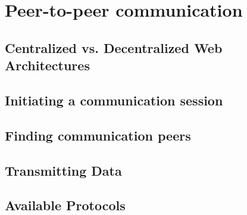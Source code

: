 
\section{Peer-to-peer communication}
\label{sec:p2p_communication}

\subsection{Centralized vs. Decentralized Web Architectures}
\label{sec:central_decentral_arch}


\subsection{Initiating a communication session}
\label{sec:p2p_init_session}


\subsection{Finding communication peers}
\label{sec:p2p_finding_peers}


\subsection{Transmitting Data}
\label{sec:p2p_data_transmit}


\subsection{Available Protocols}
\label{sec:p2p_protocols}


